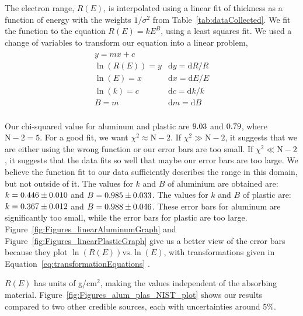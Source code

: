 The electron range, $R(E)$, is interpolated using a linear fit of thickness as a function of energy with the weights $1/\sigma^2$ from Table~\ref{tab:dataCollected}. We fit the function to the equation $R(E)=kE^B$, using a least squares fit.  We used a change of variables to transform our equation into a linear problem,
\begin{align}
	\begin{matrix}
		y = m x + c 	 						\\
		\ln(R(E)) = y 	& 	\mathrm{d}y = \mathrm{d}R/R				\\
		\ln(E) = x 		& 	\mathrm{d}x = \mathrm{d}E/E				\\
		\ln(k) = c 		& 	\mathrm{d}c = \mathrm{d}k/k				\\
		B = m 			& 	\mathrm{d}m = \mathrm{d}B				\\
	\end{matrix}
	\label{eq:transformationEquations}
\end{align}


 Our chi-squared value for aluminum and plastic are $9.03$ and $0.79$, where $\text{N}-2 =5$.  For a good fit, we want $\chi^2\approx \text{N}-2$.  If $\chi^2 \gg \text{N}-2$, it suggests that we are either using the wrong function or our error bars are too small.  If $\chi^2 \ll \text{N}-2$, it suggests that the data fits so well that maybe our error bars are too large.\cite{garcia2000numerical}  We believe the function fit to our data sufficiently describes the range in this domain, but not outside of it.  
 The values for $k$ and $B$ of aluminium are obtained are: $k = 0.446 \pm 0.010$ and $B = 0.985 \pm 0.033$. The values for $k$ and $B$ of plastic are: $k = 0.367 \pm 0.012$ and $B = 0.988 \pm 0.046$.  These error bars for aluminum are significantly too small, while the error bars for plastic are too large.  Figure~\ref{fig:Figures_linearAluminumGraph} and Figure~\ref{fig:Figures_linearPlasticGraph} give us a better view of the error bars because they plot $\ln(R(E))\mathrm{ vs. }\ln(E)$, with transformations given in Equation~\eqref{eq:transformationEquations} .

 $R(E)$ has units of g/cm$^2$, making the values independent of the absorbing material. Figure~\ref{fig:Figures_alum_plas_NIST_plot} shows our results compared to two other credible sources\cite{RevModPhys.24.28,nistData}, each with uncertainties around 5\%.  

